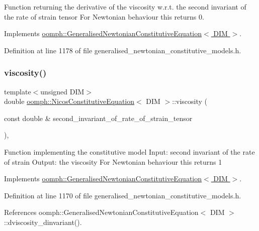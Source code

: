 Function returning the derivative of the viscosity w.\+r.\+t. the second invariant of the rate of strain tensor For Newtonian behaviour this returns 0. 

Implements \hyperlink{classoomph_1_1GeneralisedNewtonianConstitutiveEquation_ad0164e6ca57cc986048346e12c4d353a}{oomph\+::\+Generalised\+Newtonian\+Constitutive\+Equation$<$ D\+I\+M $>$}.



Definition at line 1178 of file generalised\+\_\+newtonian\+\_\+constitutive\+\_\+models.\+h.

\mbox{\label{classoomph_1_1NicosConstitutiveEquation_a69afbe7d614474de9441a4ad3805ea05}} 
\subsubsection{\texorpdfstring{viscosity()}{viscosity()}}
{\footnotesize\ttfamily template$<$unsigned D\+IM$>$ \\
double \hyperlink{classoomph_1_1NicosConstitutiveEquation}{oomph\+::\+Nicos\+Constitutive\+Equation}$<$ D\+IM $>$\+::viscosity (\begin{DoxyParamCaption}\item[{const double \&}]{second\+\_\+invariant\+\_\+of\+\_\+rate\+\_\+of\+\_\+strain\+\_\+tensor }\end{DoxyParamCaption})\hspace{0.3cm}{\ttfamily [inline]}, {\ttfamily [virtual]}}

Function implementing the constitutive model Input\+: second invariant of the rate of strain Output\+: the viscosity For Newtonian behaviour this returns 1 

Implements \hyperlink{classoomph_1_1GeneralisedNewtonianConstitutiveEquation_a3e6d811786e39ca3c3a9b1c46249442f}{oomph\+::\+Generalised\+Newtonian\+Constitutive\+Equation$<$ D\+I\+M $>$}.



Definition at line 1170 of file generalised\+\_\+newtonian\+\_\+constitutive\+\_\+models.\+h.



References oomph\+::\+Generalised\+Newtonian\+Constitutive\+Equation$<$ D\+I\+M $>$\+::dviscosity\+\_\+dinvariant().



